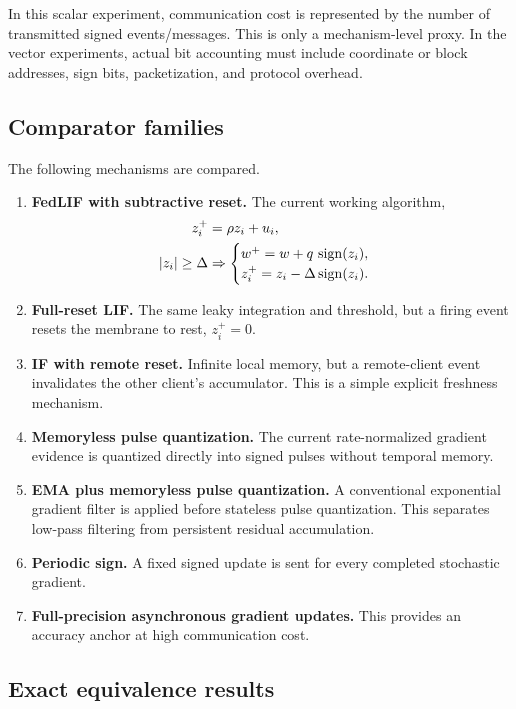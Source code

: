 In this scalar experiment, communication cost is represented by the number of transmitted signed events/messages. This is only a mechanism-level proxy. In the vector experiments, actual bit accounting must include coordinate or block addresses, sign bits, packetization, and protocol overhead.

\subsection{Comparator families}

The following mechanisms are compared.
\begin{enumerate}
  \item \textbf{FedLIF with subtractive reset.} The current working algorithm,
  \begin{align}
    z_i^+ &= \rho z_i + u_i,\\
    |z_i|\geq\Delta &\Rightarrow
    \begin{cases}
      w^+ = w + q\,\operatorname{sign}(z_i),\\
      z_i^+ = z_i-\Delta\operatorname{sign}(z_i).
    \end{cases}
  \end{align}
  \item \textbf{Full-reset LIF.} The same leaky integration and threshold, but a firing event resets the membrane to rest, $z_i^+=0$.
  \item \textbf{IF with remote reset.} Infinite local memory, but a remote-client event invalidates the other client's accumulator. This is a simple explicit freshness mechanism.
  \item \textbf{Memoryless pulse quantization.} The current rate-normalized gradient evidence is quantized directly into signed pulses without temporal memory.
  \item \textbf{EMA plus memoryless pulse quantization.} A conventional exponential gradient filter is applied before stateless pulse quantization. This separates low-pass filtering from persistent residual accumulation.
  \item \textbf{Periodic sign.} A fixed signed update is sent for every completed stochastic gradient.
  \item \textbf{Full-precision asynchronous gradient updates.} This provides an accuracy anchor at high communication cost.
\end{enumerate}

\subsection{Exact equivalence results}

